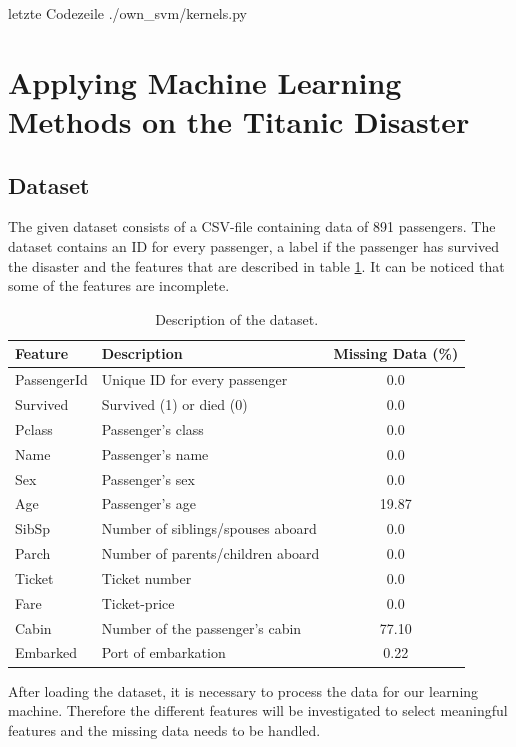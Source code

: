 letzte Codezeile
{./own_svm/kernels.py}


\section{Applying Machine Learning Methods on the Titanic Disaster}
\subsection{Dataset}
The given dataset consists of a CSV-file containing data of 891 passengers. The dataset contains an ID for every passenger, a label if the passenger has survived the disaster and the features that are described in table \ref{tab:features}. It can be noticed that some of the features are incomplete.

\begin{table}
\begin{tabular}{|l|l|c|}
\hline
Feature & Description & Missing Data (\%) \\ \hline
PassengerId & Unique ID for every passenger & 0.0 \\ \hline
Survived & Survived (1) or died (0) & 0.0 \\ \hline
Pclass & Passenger's class & 0.0 \\ \hline
Name & Passenger's name & 0.0 \\ \hline
Sex & Passenger's sex & 0.0 \\ \hline
Age & Passenger's age & 19.87 \\ \hline
SibSp & Number of siblings/spouses aboard & 0.0 \\ \hline
Parch & Number of parents/children aboard & 0.0 \\ \hline
Ticket & Ticket number & 0.0 \\ \hline
Fare & Ticket-price & 0.0 \\ \hline
Cabin & Number of the passenger's cabin & 77.10 \\ \hline
Embarked & Port of embarkation & 0.22\\ \hline
\end{tabular}
\centering
\label{tab:features}
\caption{Description of the dataset.}
\end{table}

After loading the dataset, it is necessary to process the data for our learning machine. Therefore the different features will be investigated to select meaningful features and the missing data needs to be handled.

